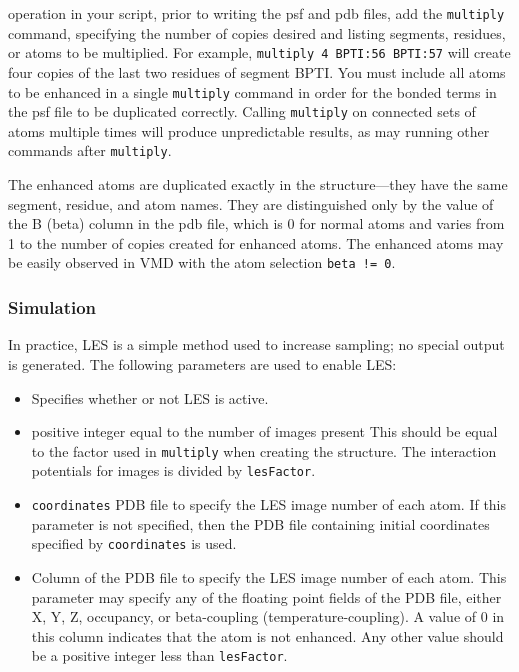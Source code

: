 operation in your script, prior to writing the psf and pdb files, add
the {\tt multiply} command, specifying the number of copies desired and
listing segments, residues, or atoms to be multiplied.  For example,
\verb#multiply 4 BPTI:56 BPTI:57# will create four copies of the last
two residues of segment BPTI.  You must include all atoms to be
enhanced in a single {\tt multiply} command in order for the bonded
terms in the psf file to be duplicated correctly.  Calling {\tt multiply}
on connected sets of atoms multiple times will produce unpredictable
results, as may running other commands after {\tt multiply}.

The enhanced atoms are duplicated exactly in the structure---they have
the same segment, residue, and atom names.  They are distinguished only
by the value of the B (beta) column in the pdb file, which is 0 for
normal atoms and varies from 1 to the number of copies created for
enhanced atoms.  The enhanced atoms may be easily observed in VMD with
the atom selection \verb#beta != 0#.

\subsubsection{Simulation}

In practice, LES is a simple method used to increase sampling;
no special output is generated.
The following parameters are used to enable LES:

\begin{itemize}

\item
{}
{Specifies whether or not LES is active.}

\item
{}
{positive integer equal to the number of images present}
{This should be equal to the factor used in {\tt multiply}
 when creating the structure.  The interaction potentials for images is
 divided by {\tt lesFactor}.  
}

\item
{} {{\tt coordinates}}
{PDB file to specify the LES image number of each atom.
If this parameter is not specified, then 
the PDB file containing initial coordinates specified by 
{\tt coordinates} is used.}

\item
{}
{Column of the PDB file to specify the LES image number of each atom.
This parameter may specify any of the floating point fields of the PDB file, 
either X, Y, Z, occupancy, or beta-coupling (temperature-coupling).  
A value of 0 in this column indicates that the atom is not enhanced.
Any other value should be a positive integer less than {\tt lesFactor}.}

\end{itemize}

